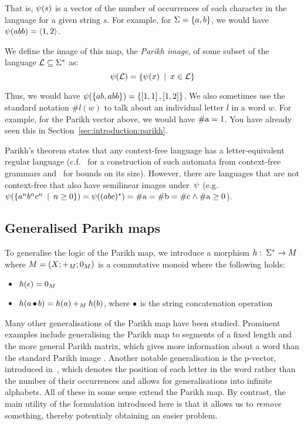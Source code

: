 \documentclass[acmsmall,review,anonymous,screen]{acmart}\settopmatter{printfolios=true,printccs=false,printacmref=true}
\theoremstyle{definition}
\newif\ifoutline
\newcommand{\contents}[1]{\ifoutline{\color{blue}
    \begin{itemize}
    #1
    \end{itemize}
  }\fi}
\begin{document}
That is, $\operatorname{\psi}(s)$ is a vector of the number of occurrences of each
character in the language for a given string $s$. For example, for  $\Sigma =
\left\{a, b\right\}$, we would have $\operatorname{\psi}(abb) = \left\langle1, 2\right\rangle$.

We define the image of this map, the \textit{Parikh image}, of some subset of
the language $\operatorname{\mathcal{L}} \subseteq \Sigma^*$ as:
\[
\operatorname{\psi}(\operatorname{\mathcal{L}}) = \left\{\operatorname{\psi}(x) \:\mid\: x \in \operatorname{\mathcal{L}}\right\}
\]

Thus, we would have $\operatorname{\psi}(\left\{ab, abb\right\}) = \left\{\left[1,
1\right], \left[1, 2\right]\right\}$. We also sometimes use the standard
notation $\#l(w)$ to talk about an individual letter $l$ in a word $w$. For
example, for the Parikh vector above, we would have $\#\text{a} = 1$. You have
already seen this in Section~\ref{sec:introduction:parikh}.

Parikh's theorem states that any context-free language has a
letter-equivalent regular language (c.f.~\cite{construction} for a construction of
such automata from context-free grammars and~\cite{bounds} for bounds on its size). However, there are languages that are
not context-free that also have semilinear images under~$\operatorname{\psi}$ (e.g.
$\operatorname{\psi}(\left\{a^nb^nc^n \:\mid\: n \geq 0\right\}) = \operatorname{\psi}((abc)^*) = \#\text{a} =
\#\text{b} = \#\text{c} \land \#\text{a} \geq 0$).

\contents{\item this means we can represent this as Presburger
\item only interested in regular languages}

\subsection{Generalised Parikh maps}\label{sec:generalised}

To generalise the logic of the Parikh map, we introduce a morphism $h:\: \Sigma^*
\to M$ where $M = \left(X;+_{M};0_{M}\right)$ is a commutative monoid where the following holds:
\begin{itemize}
  \item $h(\epsilon) = 0_{M}$
  \item $h(a \operatorname{\bullet} b) = h(a) +_{M} h(b)$, where $\operatorname{\bullet}$ is
  the string concatenation operation
\end{itemize}

Many other generalisations of the Parikh map have been studied. Prominent
examples include generalising the Parikh map to segments of a fixed length
\cite{KARHUMAKI1980155} and the more general Parikh matrix, which gives more
information about a word than the standard Parikh image \cite{parikh-matrix}.
Another notable generalisation is the p-vector, introduced
in~\cite{infinite-words}, which denotes the position of each letter in the word
rather than the number of their occurrences and allows for generalisations into
infinite alphabets. All of these in some sense extend the Parikh map. By
contrast, the main utility of the formulation introduced here is that it allows
us to \emph{remove} something, thereby potentialy obtaining an easier problem.
\end{document}
